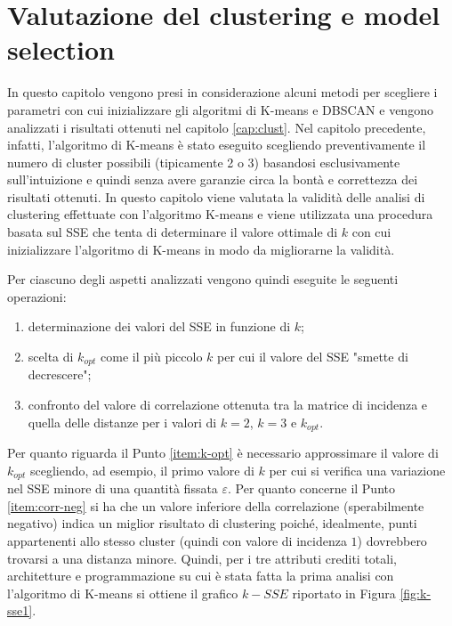 \documentclass[12pt]{article}
\begin{document}
\section{Valutazione del clustering e model selection}
\label{cap:val-clust}
In questo capitolo vengono presi in considerazione alcuni metodi per sce\-gliere i parametri con cui inizializzare gli algoritmi di K-means e DBSCAN e vengono analizzati i risultati ottenuti nel capitolo \ref{cap:clust}.
Nel capitolo prece\-dente, infatti, l'algoritmo di K-means è stato eseguito scegliendo preventi\-vamente il numero di cluster possibili (tipicamente 2 o 3) basandosi esclu\-sivamente sull'intuizione e quindi senza avere garanzie circa la bontà e corret\-tezza dei risultati ottenuti. 
In questo capitolo viene valutata la vali\-dità delle analisi di clustering effettuate con l'algoritmo K-means e viene utilizzata una procedura basata sul SSE che tenta di determinare il valore ottimale di $k$ con cui inizializzare l'algoritmo di K-means in modo da mi\-gliorarne la validità. 

Per ciascuno degli aspetti analizzati vengono quindi eseguite le seguenti operazioni:

\begin{enumerate}
\item determinazione dei valori del SSE in funzione di $k$;
\item \label{item:k-opt} scelta di $k_{opt}$ come il più piccolo $k$ per cui il valore del SSE "smette di decrescere";
\item \label{item:corr-neg} confronto del valore di correlazione ottenuta tra la matrice di incidenza e quella delle distanze per i valori di $k=2$, $k=3$ e $k_{opt}$.
\end{enumerate}
Per quanto riguarda il Punto \ref{item:k-opt} è necessario approssimare il valore di $k_{opt}$ scegliendo, ad esempio, il primo valore di $k$ per cui si verifica una varia\-zione nel SSE minore di una quantità fissata $\varepsilon$. 
Per quanto concerne il Punto \ref{item:corr-neg} si ha che un valore inferiore della correlazione (sperabilmente negativo) indica un miglior risultato di clustering poiché, idealmente, punti appartenenti allo stesso cluster (quindi con valore di incidenza $1$) dovreb\-bero trovarsi a una distanza minore. Quindi, per i tre attributi crediti totali, architetture e programmazione su cui è stata fatta la prima analisi con l'algoritmo di K-means si ottiene il grafico $k-SSE$ riportato in Figura \ref{fig:k-sse1}.
\end{document}
